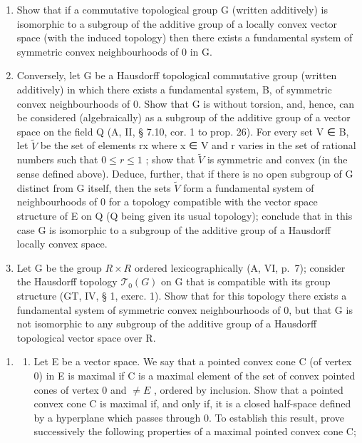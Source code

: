 \begin{enumerate}
\def\labelenumi{\alph{enumi})}
\item
  Show that if a commutative topological group G (written additively) is isomorphic to a subgroup of the additive group of a locally convex vector space (with the induced topology) then there exists a fundamental system of symmetric convex neighbourhoods of 0 in G.
\item
  Conversely, let G be a Hausdorff topological commutative group (written additively) in which there exists a fundamental system, B, of symmetric convex neighbourhoods of 0. Show that G is without torsion, and, hence, can be considered (algebraically) as a subgroup of the additive group of a vector space on the field Q (A, II, § 7.10, cor. 1 to prop. 26). For every set V ∈ B, let \(\tilde{V}\) be the set of elements rx where x ∈ V and r varies in the set of rational numbers such that \(0 \leqslant r \leqslant 1\) ; show that \(\tilde{V}\) is symmetric and convex (in the sense defined above). Deduce, further, that if there is no open subgroup of G distinct from G itself, then the sets \(\tilde{V}\) form a fundamental system of neighbourhoods of 0 for a topology compatible with the vector space structure of E on Q (Q being given its usual topology); conclude that in this case G is isomorphic to a subgroup of the additive group of a Hausdorff locally convex space.
\item
  Let G be the group \(R \times R\) ordered lexicographically (A, VI, p.~7); consider the Hausdorff topology \(\mathcal{T}_{0}(G)\) on G that is compatible with its group structure (GT, IV, § 1, exerc. 1). Show that for this topology there exists a fundamental system of symmetric convex neighbourhoods of 0, but that G is not isomorphic to any subgroup of the additive group of a Hausdorff topological vector space over R.
\end{enumerate}

\exercisegroup

\begin{enumerate}
\def\labelenumi{\arabic{enumi})}
\tightlist
\item
  \begin{enumerate}
  \def\labelenumii{\alph{enumii})}
  \tightlist
  \item
    Let E be a vector space. We say that a pointed convex cone C (of vertex 0) in E is maximal if C is a maximal element of the set of convex pointed cones of vertex 0 and \(\neq E\) , ordered by inclusion. Show that a pointed convex cone C is maximal if, and only if, it is a closed half-space defined by a hyperplane which passes through 0. To establish this result, prove successively the following properties of a maximal pointed convex cone C;
  \end{enumerate}
\end{enumerate}

